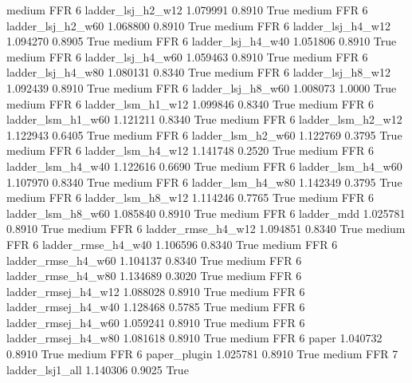     medium      FFR                 6   ladder_lsj_h2_w12   1.079991      0.8910    True
    medium      FFR                 6   ladder_lsj_h2_w60   1.068800      0.8910    True
    medium      FFR                 6   ladder_lsj_h4_w12   1.094270      0.8905    True
    medium      FFR                 6   ladder_lsj_h4_w40   1.051806      0.8910    True
    medium      FFR                 6   ladder_lsj_h4_w60   1.059463      0.8910    True
    medium      FFR                 6   ladder_lsj_h4_w80   1.080131      0.8340    True
    medium      FFR                 6   ladder_lsj_h8_w12   1.092439      0.8910    True
    medium      FFR                 6   ladder_lsj_h8_w60   1.008073      1.0000    True
    medium      FFR                 6   ladder_lsm_h1_w12   1.099846      0.8340    True
    medium      FFR                 6   ladder_lsm_h1_w60   1.121211      0.8340    True
    medium      FFR                 6   ladder_lsm_h2_w12   1.122943      0.6405    True
    medium      FFR                 6   ladder_lsm_h2_w60   1.122769      0.3795    True
    medium      FFR                 6   ladder_lsm_h4_w12   1.141748      0.2520    True
    medium      FFR                 6   ladder_lsm_h4_w40   1.122616      0.6690    True
    medium      FFR                 6   ladder_lsm_h4_w60   1.107970      0.8340    True
    medium      FFR                 6   ladder_lsm_h4_w80   1.142349      0.3795    True
    medium      FFR                 6   ladder_lsm_h8_w12   1.114246      0.7765    True
    medium      FFR                 6   ladder_lsm_h8_w60   1.085840      0.8910    True
    medium      FFR                 6          ladder_mdd   1.025781      0.8910    True
    medium      FFR                 6  ladder_rmse_h4_w12   1.094851      0.8340    True
    medium      FFR                 6  ladder_rmse_h4_w40   1.106596      0.8340    True
    medium      FFR                 6  ladder_rmse_h4_w60   1.104137      0.8340    True
    medium      FFR                 6  ladder_rmse_h4_w80   1.134689      0.3020    True
    medium      FFR                 6 ladder_rmsej_h4_w12   1.088028      0.8910    True
    medium      FFR                 6 ladder_rmsej_h4_w40   1.128468      0.5785    True
    medium      FFR                 6 ladder_rmsej_h4_w60   1.059241      0.8910    True
    medium      FFR                 6 ladder_rmsej_h4_w80   1.081618      0.8910    True
    medium      FFR                 6               paper   1.040732      0.8910    True
    medium      FFR                 6        paper_plugin   1.025781      0.8910    True
    medium      FFR                 7     ladder_lsj1_all   1.140306      0.9025    True
